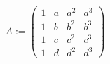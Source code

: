 \[ A := \begin{pmatrix}
	1 & a & a^2 & a^3 \\ 
	1 & b & b^2 & b^3 \\ 
	1 & c & c^2 & c^3 \\ 
	1 & d & d^2 & d^3
\end{pmatrix} \]